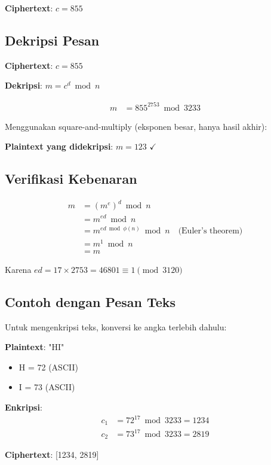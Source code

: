 \textbf{Ciphertext}: $c = 855$

\subsection{Dekripsi Pesan}

\textbf{Ciphertext}: $c = 855$

\textbf{Dekripsi}: $m = c^d \bmod n$

\begin{align*}
m &= 855^{2753} \bmod 3233
\end{align*}

Menggunakan square-and-multiply (eksponen besar, hanya hasil akhir):

\textbf{Plaintext yang didekripsi}: $m = 123$ $\checkmark$

\subsection{Verifikasi Kebenaran}

\begin{align*}
m &= (m^e)^d \bmod n \\
  &= m^{ed} \bmod n \\
  &= m^{ed \bmod \phi(n)} \bmod n \quad \text{(Euler's theorem)} \\
  &= m^1 \bmod n \\
  &= m
\end{align*}

Karena $ed = 17 \times 2753 = 46801 \equiv 1 \pmod{3120}$

\subsection{Contoh dengan Pesan Teks}

Untuk mengenkripsi teks, konversi ke angka terlebih dahulu:

\textbf{Plaintext}: "HI"
\begin{itemize}
  \item H = 72 (ASCII)
  \item I = 73 (ASCII)
\end{itemize}

\textbf{Enkripsi}:
\begin{align*}
c_1 &= 72^{17} \bmod 3233 = 1234 \\
c_2 &= 73^{17} \bmod 3233 = 2819
\end{align*}

\textbf{Ciphertext}: [1234, 2819]

